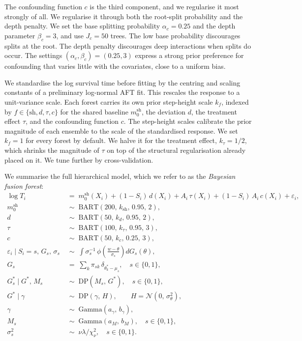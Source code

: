 The confounding function $c$ is the third component, and we regularise it most strongly of all.
We regularise it through both the root-split probability and the depth penalty.
We set the base splitting probability $\alpha_c = 0.25$ and the depth parameter $\beta_c = 3$, and use $J_c = 50$ trees.
The low base probability discourages splits at the root.
The depth penalty discourages deep interactions when splits do occur.
The settings $(\alpha_c, \beta_c) = (0.25, 3)$ express a strong prior preference for confounding that varies little with the covariates, close to a uniform bias.

We standardise the log survival time before fitting by the centring and scaling constants of a preliminary log-normal AFT fit.
This rescales the response to a unit-variance scale.
Each forest carries its own prior step-height scale $k_f$, indexed by $f \in \{\mathrm{sh}, d, \tau, c\}$ for the shared baseline $m_0^{\mathrm{sh}}$, the deviation $d$, the treatment effect $\tau$, and the confounding function $c$.
The step-height scales calibrate the prior magnitude of each ensemble to the scale of the standardised response.
We set $k_f = 1$ for every forest by default.
We halve it for the treatment effect, $k_\tau = 1/2$, which shrinks the magnitude of $\tau$ on top of the structural regularisation already placed on it.
We tune further by cross-validation.

We summarise the full hierarchical model, which we refer to as the \emph{Bayesian fusion forest}:
\begin{align*}
\log T_i &\;=\; m_0^{\mathrm{sh}}(X_i) + (1 - S_i)\, d(X_i) + A_i\, \tau(X_i) + (1 - S_i)\, A_i\, c(X_i) + \varepsilon_i, \\
m_0^{\mathrm{sh}} &\;\sim\; \mathrm{BART}(200,\, k_{\mathrm{sh}},\, 0.95,\, 2), \\
d &\;\sim\; \mathrm{BART}(50,\, k_d,\, 0.95,\, 2), \\
\tau &\;\sim\; \mathrm{BART}(100,\, k_\tau,\, 0.95,\, 3), \\
c &\;\sim\; \mathrm{BART}(50,\, k_c,\, 0.25,\, 3), \\
\varepsilon_i \mid S_i = s,\, G_s,\, \sigma_s &\;\sim\; \int \sigma_s^{-1}\, \phi\!\left(\tfrac{w - \theta}{\sigma_s}\right) dG_s(\theta), \\
G_s &\;=\; \textstyle\sum_k \pi_{sk}\, \delta_{\theta_k^* - \mu_s}, \quad s \in \{0, 1\}, \\
G_s^* \mid G^*,\, M_s &\;\sim\; \mathrm{DP}(M_s,\, G^*), \quad s \in \{0, 1\}, \\
G^* \mid \gamma &\;\sim\; \mathrm{DP}(\gamma,\, H), \qquad H = \mathcal{N}(0,\, \sigma_\theta^2), \\
\gamma &\;\sim\; \mathrm{Gamma}(a_\gamma,\, b_\gamma), \\
M_s &\;\sim\; \mathrm{Gamma}(a_M,\, b_M), \quad s \in \{0, 1\}, \\
\sigma_s^2 &\;\sim\; \nu\lambda / \chi^2_\nu, \quad s \in \{0, 1\}.
\end{align*}


